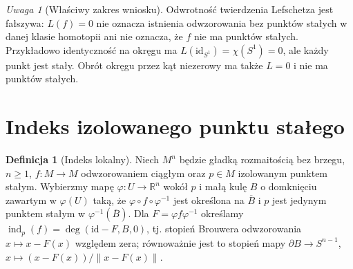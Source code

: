 \documentclass[11pt,a4paper,oneside]{report}
\newcommand{\R}{\mathbb{R}}
\newcommand{\id}{\mathrm{id}}
\theoremstyle{plain}
\theoremstyle{definition}
\newtheorem{definicja}[twierdzenie]{Definicja}
\theoremstyle{remark}
\newtheorem{uwaga}[twierdzenie]{Uwaga}
\begin{document}
\begin{uwaga}[Właściwy zakres wniosku]
Odwrotność twierdzenia Lefschetza jest fałszywa:
$L(f)=0$ nie oznacza istnienia odwzorowania bez punktów
stałych w danej klasie homotopii ani nie oznacza, że
$f$ nie ma punktów stałych. Przykładowo identyczność
na okręgu ma $L(\id_{S^1})=\chi(S^1)=0$, ale każdy
punkt jest stały. Obrót okręgu przez kąt niezerowy
ma także $L=0$ i nie ma punktów stałych.
\end{uwaga}

\section{Indeks izolowanego punktu stałego}
\begin{definicja}[Indeks lokalny]
\label{def:fixed-index-v10}
Niech $M^n$ będzie gładką rozmaitością bez brzegu,
$n\ge1$, $f:M\to M$ odwzorowaniem ciągłym oraz
$p\in M$ izolowanym punktem stałym. Wybierzmy mapę
$\varphi:U\to\R^n$ wokół $p$ i małą kulę $B$
o domknięciu zawartym w $\varphi(U)$ taką, że
$\varphi\circ f\circ\varphi^{-1}$ jest określona
na $\overline B$ i $p$ jest jedynym punktem stałym
w $\varphi^{-1}(\overline B)$. Dla $F=\varphi f\varphi^{-1}$
określamy
$\operatorname{ind}_p(f)=\deg(\id-F,B,0)$,
tj. stopień Brouwera odwzorowania
$x\mapsto x-F(x)$ względem zera; równoważnie jest to
stopień mapy
$\partial B\to S^{n-1}$, $x\mapsto(x-F(x))/\|x-F(x)\|$.
\end{definicja}
\end{document}
